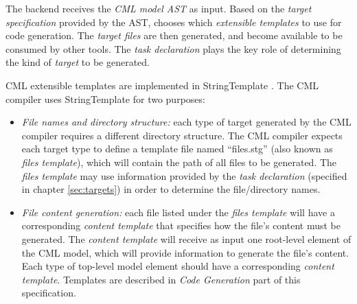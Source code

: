 The backend receives the \emph{CML model AST} as input.
Based on the \emph{target specification} provided by the AST, chooses which \emph{extensible templates} to use for code generation.
The \emph{target files} are then generated, and become available to be consumed by other tools. The \emph{task declaration} plays the key role of determining the kind of \emph{target} to be generated.

CML extensible templates are implemented in StringTemplate \cite{st}.  The CML compiler uses StringTemplate for two purposes:

\begin{itemize}
\item \emph{File names and directory structure:}
each type of target generated by the CML compiler requires a different directory structure.
The CML compiler expects each target type to define a template file named ``files.stg'' (also known as \emph{files template}),
which will contain the path of all files to be generated. The \emph{files template} may use information provided by the \emph{task declaration} (specified in chapter \ref{sec:targets}) in order to determine the file/directory names.
\item \emph{File content generation:}
each file listed under the \emph{files template} will have a corresponding \emph{content template} that specifies how the file's content must be generated. The \emph{content template} will receive as input one root-level element of the CML model, which will provide information to generate the file's content.
Each type of top-level model element should have a corresponding \emph{content template}. Templates are described in \emph{Code Generation} part of this specification.
\end{itemize}
